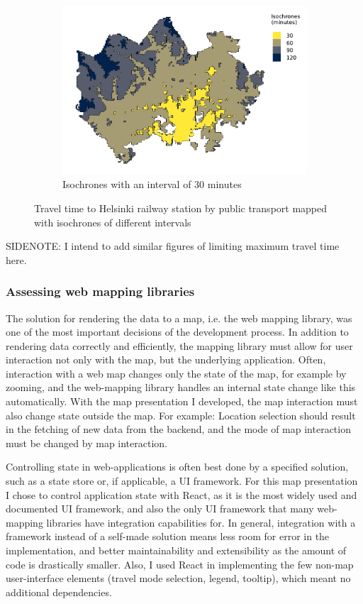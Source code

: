 \begin{figure}[H]
\begin{subfigure}[b]{0.5\textwidth}
		\includegraphics[width=\textwidth]{visual/figures/ttm/isochrone_interval_30}
		\caption{Isochrones with an interval of 30 minutes}
		\label{fig:interval 30}
	\end{subfigure}%
	\caption{Travel time to Helsinki railway station by public transport mapped with isochrones of different intervals}
	\label{fig:isochrone intervals}
\end{figure}

SIDENOTE: I intend to add similar figures of limiting maximum travel time here.

\subsubsection{Assessing web mapping libraries}

The solution for rendering the data to a map, i.e. the web mapping library,
was one of the most important decisions of the development process. 
In addition to rendering data correctly and efficiently,
the mapping library must allow for user interaction not only with the map,
but the underlying application.
Often, interaction with a web map changes only the state of the map,
for example by zooming,
and the web-mapping library handles an internal state change like this automatically.
With the map presentation I developed,
the map interaction must also change state outside the map.
For example:
Location selection should result in the fetching of new data from the backend,
and the mode of map interaction must be changed by map interaction.

Controlling state in web-applications is often best done by a specified solution,
such as a state store or, if applicable, a UI framework.
For this map presentation I chose to control application state with React,
as it is the most widely used and documented UI framework,
and also the only UI framework that many web-mapping libraries have integration capabilities for.
In general, integration with a framework instead of a self-made solution
means less room for error in the implementation,
and better maintainability and extensibility as the amount of code is drastically smaller.
Also, I used React in implementing the few non-map user-interface elements
(travel mode selection, legend, tooltip),
which meant no additional dependencies.

